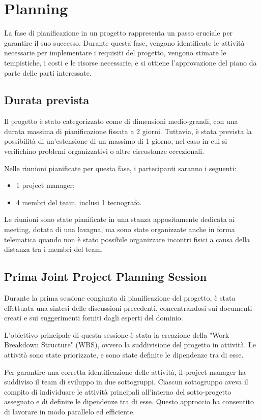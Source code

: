 \section{Planning}

La fase di pianificazione in un progetto rappresenta un passo cruciale per garantire il suo successo. 
Durante questa fase, vengono identificate le attività necessarie per implementare i requisiti del progetto, vengono stimate le tempistiche, 
i costi e le risorse necessarie, e si ottiene l'approvazione del piano da parte delle parti interessate.

\subsection{Durata prevista}
Il progetto è stato categorizzato come di dimensioni medio-grandi, con una durata massima di pianificazione fissata a 2 giorni. 
Tuttavia, è stata prevista la possibilità di un'estensione di un massimo di 1 giorno, nel caso in cui si verifichino problemi 
organizzativi o altre circostanze eccezionali.

Nelle riunioni pianificate per questa fase, i partecipanti saranno i seguenti:
\begin{itemize}
    \item 1 project manager;
    \item 4 membri del team, inclusi 1 tecnografo.
\end{itemize}

Le riunioni sono state pianificate in una stanza appositamente dedicata ai meeting, dotata di una lavagna, ma sono state organizzate 
anche in forma telematica quando non è stato possibile organizzare incontri fisici a causa della distanza tra i membri del team.

\subsection{Prima Joint Project Planning Session}
Durante la prima sessione congiunta di pianificazione del progetto, è stata effettuata una sintesi delle discussioni precedenti, 
concentrandosi sui documenti creati e sui suggerimenti forniti dagli esperti del dominio.

L'obiettivo principale di questa sessione è stata la creazione della "Work Breakdown Structure" (WBS), ovvero la suddivisione 
del progetto in attività. Le attività sono state priorizzate, e sono state definite le dipendenze tra di esse.

Per garantire una corretta identificazione delle attività, il project manager ha suddiviso il team di sviluppo in due sottogruppi. 
Ciascun sottogruppo aveva il compito di individuare le attività principali all'interno del sotto-progetto assegnato e di definire 
le dipendenze tra di esse. Questo approccio ha consentito di lavorare in modo parallelo ed efficiente.

